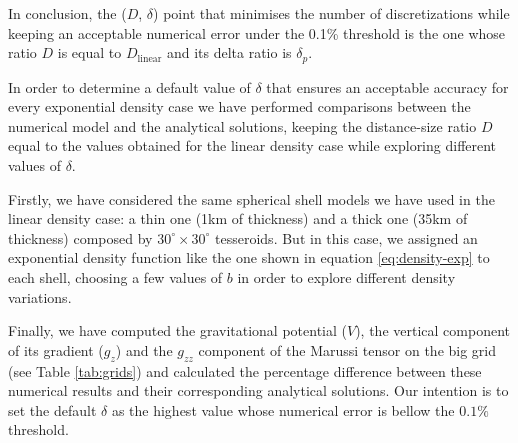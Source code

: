 \documentclass[extra]{gji}
\begin{document}
In conclusion, the ($D$, $\delta$) point that minimises the number of 
discretizations while keeping an acceptable numerical error under the 
0.1\% threshold is the one whose ratio $D$ is equal to 
$D_\text{linear}$ and its delta ratio is $\delta_p$.

In order to determine a default value of $\delta$ that ensures an 
acceptable accuracy for every exponential density case we have 
performed comparisons between the numerical model and the analytical 
solutions, keeping the distance-size ratio $D$ equal to the values 
obtained for the linear density case while exploring different values of 
$\delta$.

Firstly, we have considered the same spherical shell models we have 
used in the linear density case: a thin one (1km of thickness) and a 
thick one (35km of thickness) composed by $30^\circ \times 30^\circ$ 
tesseroids.
But in this case, we assigned an exponential density function like the 
one shown in equation \ref{eq:density-exp} to each shell, choosing 
a few values of $b$ in order to explore different density 
variations.

Finally, we have computed the gravitational potential ($V$), the 
vertical component of its gradient ($g_z$) and the $g_{zz}$ component of 
the Marussi tensor on the big grid (see Table \ref{tab:grids}) and 
calculated the percentage difference between these numerical results and 
their corresponding analytical solutions.
Our intention is to set the default $\delta$ as the highest value whose 
numerical error is bellow the $0.1\%$ threshold.




\end{document}

